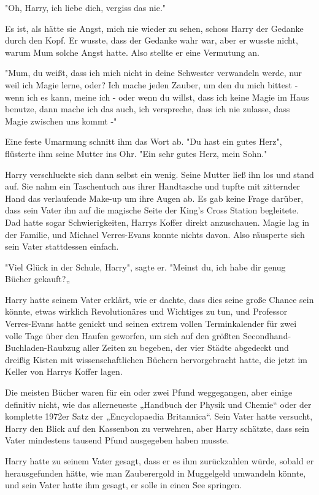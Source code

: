 {"Oh, Harry, ich liebe dich, vergiss das nie."

Es ist, als hätte sie Angst, mich nie wieder zu sehen, schoss Harry der Gedanke durch den Kopf. Er wusste, dass der Gedanke wahr war, aber er wusste nicht, warum Mum solche Angst hatte. Also stellte er eine Vermutung an.

"Mum, du weißt, dass ich mich nicht in deine Schwester verwandeln werde, nur weil ich Magie lerne, oder? Ich mache jeden Zauber, um den du mich bittest - wenn ich es kann, meine ich - oder wenn du willst, dass ich keine Magie im Haus benutze, dann mache ich das auch, ich verspreche, dass ich nie zulasse, dass Magie zwischen uns kommt -"

Eine feste Umarmung schnitt ihm das Wort ab. "Du hast ein gutes Herz", flüsterte ihm seine Mutter ins Ohr. "Ein sehr gutes Herz, mein Sohn."

Harry verschluckte sich dann selbst ein wenig. Seine Mutter ließ ihn los und stand auf. Sie nahm ein Taschentuch aus ihrer Handtasche und tupfte mit zitternder Hand das verlaufende Make-up um ihre Augen ab. Es gab keine Frage darüber, dass sein Vater ihn auf die magische Seite der King's Cross Station begleitete. Dad hatte sogar Schwierigkeiten, Harrys Koffer direkt anzuschauen. Magie lag in der Familie, und Michael Verres-Evans konnte nichts davon. Also räusperte sich sein Vater stattdessen einfach.

"Viel Glück in der Schule, Harry", sagte er. "Meinst du, ich habe dir genug Bücher gekauft?„

Harry hatte seinem Vater erklärt, wie er dachte, dass dies seine große Chance sein könnte, etwas wirklich Revolutionäres und Wichtiges zu tun, und Professor Verres-Evans hatte genickt und seinen extrem vollen Terminkalender für zwei volle Tage über den Haufen geworfen, um sich auf den größten Secondhand-Buchladen-Raubzug aller Zeiten zu begeben, der vier Städte abgedeckt und dreißig Kisten mit wissenschaftlichen Büchern hervorgebracht hatte, die jetzt im Keller von Harrys Koffer lagen.

Die meisten Bücher waren für ein oder zwei Pfund weggegangen, aber einige definitiv nicht, wie das allerneueste „Handbuch der Physik und Chemie“ oder der komplette 1972er Satz der „Encyclopaedia Britannica“. Sein Vater hatte versucht, Harry den Blick auf den Kassenbon zu verwehren, aber Harry schätzte, dass sein Vater mindestens tausend Pfund ausgegeben haben musste.

Harry hatte zu seinem Vater gesagt, dass er es ihm zurückzahlen würde, sobald er herausgefunden hätte, wie man Zauberergold in Muggelgeld umwandeln könnte, und sein Vater hatte ihm gesagt, er solle in einen See springen.

}
